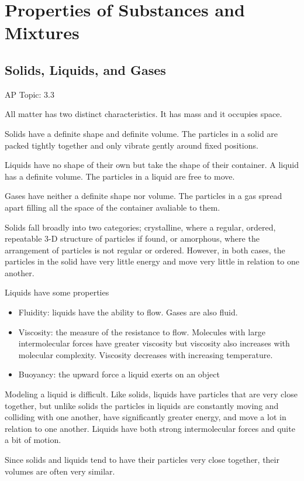 \documentclass[../chem.tex]{subfiles}
\begin{document}
\chapter{Properties of Substances and Mixtures}
\section{Solids, Liquids, and Gases}
AP Topic: 3.3

All matter has two distinct characteristics. It has mass and it occupies space. 

Solids have a definite shape and definite volume. The particles in a solid are packed tightly together and only vibrate gently around fixed positions.

Liquids have no shape of their own but take the shape of their container. A liquid has a definite volume. The particles in a liquid are free to move.

Gases have neither a definite shape nor volume. The particles in a gas spread apart filling all the space of the container avaliable to them.

Solids fall broadly into two categories; crystalline, where a regular, ordered, repeatable 3-D structure of particles if found, or 
amorphous, where the arrangement of particles is not regular or ordered. However, in both cases, the particles in the solid have very 
little energy and move very little in relation to one another.

Liquids have some properties 
\begin{itemize}
    \item Fluidity: liquids have the ability to flow. Gases are also fluid.
    \item Viscosity: the measure of the resistance to flow. Molecules with large intermolecular forces have greater viscosity but viscosity also increases with molecular complexity. Viscosity decreases with increasing temperature.
    \item Buoyancy: the upward force a liquid exerts on an object
\end{itemize}

Modeling a liquid is difficult. Like solids, liquids have particles that are very close together, but unlike solids the particles in liquids 
are constantly moving and colliding with one another, have significantly greater energy, and move a lot in relation to one another. Liquids have both 
strong intermolecular forces and quite a bit of motion.

Since solids and liquids tend to have their particles very close together, their volumes are often very similar.
\end{document}
